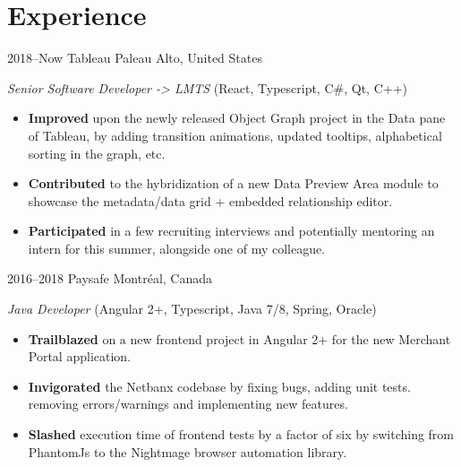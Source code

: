\documentclass[]{friggeri-cv}
\begin{document}
\section{Experience}
\begin{entrylist}

\entry
{2018--Now}
{Tableau}
{Paleau Alto, United States}
{\emph{Senior Software Developer -> LMTS} (React, Typescript, C#, Qt, C++)
\begin{itemize}
	\item \textbf{Improved} upon the newly released Object Graph project in the Data pane of Tableau, by adding transition animations, updated tooltips, alphabetical sorting in the graph, etc.
	\item \textbf{Contributed} to the hybridization of a new Data Preview Area module to showcase the metadata/data grid + embedded relationship editor. 
	\item \textbf{Participated} in a few recruiting interviews and potentially mentoring an intern for this summer, alongside one of my colleague.
\end{itemize}
}


\entry
{2016--2018}
{Paysafe}
{Montréal, Canada}
{\emph{Java Developer} (Angular 2+, Typescript, Java 7/8, Spring, Oracle)
\begin{itemize}
	\item \textbf{Trailblazed} on a new frontend project in Angular 2+ for the new Merchant Portal application.
	\item \textbf{Invigorated} the Netbanx codebase by fixing bugs, adding unit tests. removing errors/warnings and implementing new features.
	\item \textbf{Slashed} execution time of frontend tests by a factor of six by switching from PhantomJs to the Nightmage browser automation library.
\end{itemize}
}



\end{entrylist}
\end{document}
